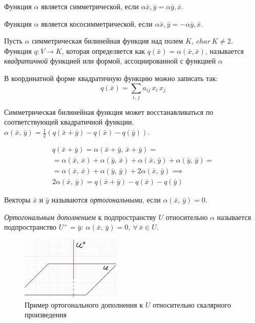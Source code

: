 Функция $\alpha$ является симметрической, если $\alpha{\bar{x}, \bar{y}} = \alpha{\bar{y}, \bar{x}}$.

Функция $\alpha$ является кососимметрической, если $\alpha{\bar{x}, \bar{y}} = -\alpha{\bar{y}, \bar{x}}$.

\begin{definition}
  Пусть $\alpha$ симметрическая билинейная функция над полем $K,~ char\, K \neq 2$. Функция $q: V \to K$, которая определяется как $q(\bar{x}) = \alpha(\bar{x}, \bar{x})$, называется \textit{квадратичной} функцией или формой, ассоциированной с функцией $\alpha$
\end{definition}

В координатной форме квадратичную функцию можно записать так:
$$
  q(\bar{x}) = \sum_{i,\, j} a_{ij}\,x_i\, x_j
$$

Симметрическая билинейная функция может восстанавливаться по соответствующей квадратичной функции.
$\alpha(\bar{x},\, \bar{y}) = \frac{1}{2} (q(\bar{x} + \bar{y}) - q(\bar{x}) - q(\bar{y}))$.
\begin{Proof}
  \begin{gather*}
    q(\bar{x} + \bar{y}) = \alpha(\bar{x} + \bar{y},\, \bar{x} + \bar{y}) = \\
    = \alpha(\bar{x}, \, \bar{x}) + \alpha(\bar{y},\, \bar{x}) + \alpha(\bar{x}, \, \bar{y}) + \alpha(\bar{y}, \, \bar{y}) = \\
    = \alpha(\bar{x}, \, \bar{x}) + \alpha(\bar{y}, \, \bar{y}) + 2\alpha(\bar{x}, \, \bar{y}) \implies \\
    2\alpha(\bar{x}, \, \bar{y}) = q(\bar{x} + \bar{y}) - q(\bar{x}) - q(\bar{y})
  \end{gather*}
\end{Proof}

\begin{definition}
  Векторы $\bar{x}$ и $\bar{y}$ называются \textit{ортогональными}, если $\alpha(\bar{x}, \, \bar{y}) = 0$.
\end{definition}

\begin{definition}
  \textit{Ортогональным дополнением} к подпространству $U$ относительно $\alpha$ называется подпространство $U^+ = {\bar{y}:~ \alpha(\bar{x}, \, \bar{y}) = 0, ~ \forall \, \bar{x} \in U}$.
\end{definition}

\begin{figure}[H]
  \centering
  \includegraphics[height = 3cm]{images/map_form_ortog.png}
  \caption{Пример ортогонального дополнения к $U$ относительно скалярного произведения}
\end{figure}

